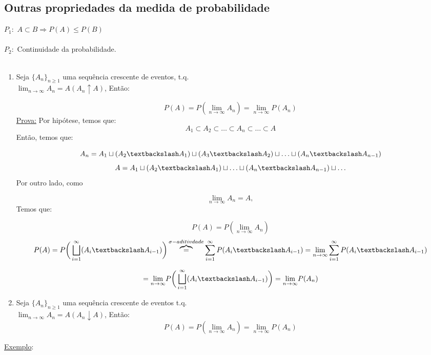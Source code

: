 \documentclass[a4paper,12pt]{article}
\begin{document}
\begin{enumerate}[label = \alph*)]
\subsection{Outras propriedades da medida de probabilidade}

$P_1:$   $A\subset B \Rightarrow P(A)\le P(B) $\\
\\
$P_2:$  Continuidade da probabilidade.\\
\\
\begin{enumerate}[label=\alph*)]
	\item Seja $\{A_n\}_{n\ge 1} $ uma sequência crescente de eventos, t.q. \\$\displaystyle{\lim_{n \to \infty}} A_n=A (A_n \uparrow A)$, Então:

$$P(A)=P(\displaystyle{\lim_{n\to \infty}} A_n)= \displaystyle{\lim_{n \to \infty}} P(A_n)$$
\underline{Prova:} Por hipótese, temos que:
$$A_1\subset A_2\subset \ldots \subset A_n \subset \ldots \subset A$$
Então, temos que:

$$A_n=A_1\sqcup(A_2\textbackslash A_1)\sqcup(A_3\textbackslash A_2)\sqcup\ldots\sqcup(A_n\textbackslash A_{n-1})  $$
$$A=A_1\sqcup(A_2\textbackslash A_1)\sqcup\ldots\sqcup(A_n\textbackslash A_{n-1})\sqcup \ldots $$
Por outro lado, como

$$\displaystyle{\lim_{n \to \infty}} A_n=A, $$
Temos que:

$$P(A) = P(\displaystyle{\lim_{n \to \infty}}A_n) $$
$$P(A) = P\bigg(\bigsqcup\limits_{i=1}^\infty (A_i\textbackslash A_{i-1})\bigg) \overbrace{=}^{\sigma-aditivdade}
\sum\limits_{i=1}^{\infty}P(A_i\textbackslash A_{i-1}) = \displaystyle{\lim_{n \to \infty}}  \sum\limits_{i=1}^{\infty} P(A_i\textbackslash A_{i-1})
$$

$$ 
=\displaystyle{\lim_{n \to \infty}}  P\bigg(\bigsqcup\limits_{i=1}^\infty (A_i\textbackslash A_{i-1})\bigg)  = \displaystyle{\lim_{n \to \infty}} P(A_n)
$$



\item Seja $\{A_n\}_{n\ge 1} $ uma sequência crescente de eventos  t.q. \\$\displaystyle{\lim_{n \to \infty}} A_n=A (A_n \downarrow A)$, Então:
$$P(A)=P(\displaystyle{\lim_{n \to \infty}} A_n)= \displaystyle{\lim_{n \to \infty}} P(A_n)$$
\end{enumerate}



\underline{Exemplo}:


\end{enumerate}
\end{document}
